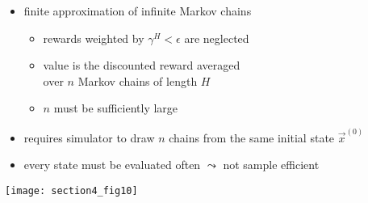 	\vspace{1mm}
	\begin{itemize}
		\item finite approximation of infinite Markov chains
			\vspace{.5mm}
			\begin{itemize}
				\item rewards weighted by $\gamma^H < \epsilon$ are neglected
				\vspace{.5mm}
				\item value is the discounted reward averaged \\
					over $n$ Markov chains of length $H$
				\vspace{.5mm}
				\item $n$ must be sufficiently large
			\end{itemize}
		\vspace{2mm}
		\item requires simulator to draw $n$ chains 
			from the same initial state $\vec x^{(0)}$
		\vspace{2mm}
		\item every state must be evaluated often 
			$\leadsto$ not sample efficient
	\end{itemize}
	
	\begin{center}
		\texttt{[image: section4\_fig10]}
	\end{center}


